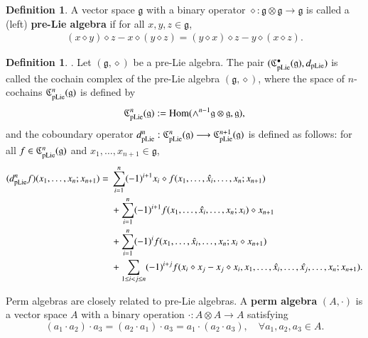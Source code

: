 \documentclass[12pt]{amsart}
\theoremstyle{definition}
\newtheorem{defi}[thm]{Definition}
\newcommand{\g}{\mathfrak g}
\newcommand{\frkC}{\mathfrak C}
\newcommand{\Hom}{\mathrm{Hom}}
\newcommand{\ot}{\otimes}
\newcommand{\pl}{{\rm pLie}}
\begin{document}
 \begin{defi}
 	A vector space $\g$ with a binary operator $\diamond:\g\ot\g\to \g$ is called a (left) \textbf{pre-Lie algebra} if for all $x,y,z\in\g$,
 	\begin{align*}
 	(x\diamond y)\diamond z-x\diamond(y\diamond z)=(y\diamond x)\diamond z-y\diamond(x\diamond z).
 	\end{align*}
 \end{defi}

\begin{defi}\cite{D1999,GuLST}.
	Let $(\g,\diamond)$ be a pre-Lie algebra. The pair
	$(\frkC_{\pl}^\bullet(\g),d_\pl)$ is called the cochain complex
	of the pre-Lie algebra $(\g,\diamond)$, where the space of $n$-cochains
	$\frkC_{\pl}^n(\g)$ is defined by
	\begin{align}\label{eq:pLie-n-cochain}
		\frkC_{\pl}^n(\g):=\Hom(\wedge^{n-1}\g\otimes\g,\g),
	\end{align}
and	the coboundary operator
$
d_\pl^n:\frkC_{\pl}^n(\g)\longrightarrow\frkC_{\pl}^{n+1}(\g)
$
is defined as follows: for all $f\in\frkC_{\pl}^n(\g)$ and
$x_1,\ldots,x_{n+1}\in\g$,
\begin{align*}
(d_\pl^n f)(x_1,\ldots,x_n;x_{n+1})={}&\sum_{i=1}^n(-1)^{i+1}x_i\diamond f(x_1,\ldots,\hat{x_i},\ldots,x_n;x_{n+1})\\
&+\sum_{i=1}^n(-1)^{i+1}f(x_1,\ldots,\hat{x_i},\ldots,x_n;x_i)\diamond x_{n+1}\\
&+\sum_{i=1}^n(-1)^if(x_1,\ldots,\hat{x_i},\ldots,x_n;x_i\diamond x_{n+1})\\
&+\sum_{1\leq i<j\leq n}(-1)^{i+j}f(x_i\diamond x_j-x_j\diamond x_i,x_1,\ldots,\hat{x_i},\ldots,\hat{x_j},\ldots,x_n;x_{n+1}).
\end{align*}
\end{defi}

Perm algebras are closely related to pre-Lie algebras. A \textbf{perm algebra} $(A,\cdot)$ is a vector space $A$ with a binary operation $\cdot:A\ot A\to A$ satisfying
\[
(a_1\cdot a_2)\cdot a_3 = (a_2\cdot a_1)\cdot a_3 = a_1\cdot(a_2\cdot a_3),\quad \forall a_1,a_2,a_3\in A.
\]
\end{document}
